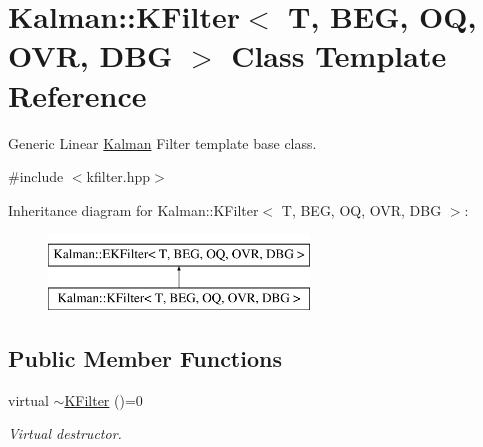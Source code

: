 \hypertarget{classKalman_1_1KFilter}{}\section{Kalman\+:\+:K\+Filter$<$ T, B\+EG, OQ, O\+VR, D\+BG $>$ Class Template Reference}
\label{classKalman_1_1KFilter}


Generic Linear \mbox{\hyperlink{namespaceKalman}{Kalman}} Filter template base class.  




{\ttfamily \#include $<$kfilter.\+hpp$>$}

Inheritance diagram for Kalman\+:\+:K\+Filter$<$ T, B\+EG, OQ, O\+VR, D\+BG $>$\+:\begin{figure}[H]
\begin{center}
\leavevmode
\includegraphics[height=2.000000cm]{classKalman_1_1KFilter}
\end{center}
\end{figure}
\subsection*{Public Member Functions}
\begin{DoxyCompactItemize}
\item 
\mbox{\label{classKalman_1_1KFilter_afb0f1cdf93ff2aace98ac074feea7142}} 
virtual \mbox{\hyperlink{classKalman_1_1KFilter_afb0f1cdf93ff2aace98ac074feea7142}{$\sim$\+K\+Filter}} ()=0
\begin{DoxyCompactList}\small\item\em Virtual destructor. \end{DoxyCompactList}\end{DoxyCompactItemize}
